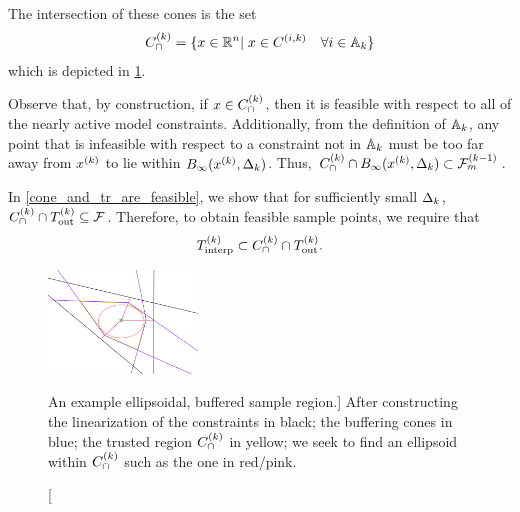 The intersection of these cones is the set
\begin{align}
{C^{(k)}_{\cap}} = \{x\in\mathbb R^n | \; x \in {C^{(i, k)}} \quad \forall i \in {\mathbb A_{k}} \} \label{define_capcones}
\end{align}
which is depicted in \cref{completed_2}.


Observe that, by construction,  if $x \in {C^{(k)}_{\cap}}$, then it is feasible with respect to all of the nearly active model constraints.  Additionally,  from the definition of ${\mathbb A_{k}}$, any point that is infeasible with respect to a constraint not in ${\mathbb A_{k}}$ must be too far away from $x^{(k)}$ to lie within  $B_\infty(x^{(k)},\Delta_k)$.  Thus, 
${C^{(k)}_{\cap}} \cap B_\infty(x^{(k)},\Delta_k) \subset {\mathcal F_m^{(k-1)}}$.  

In \cref{cone_and_tr_are_feasible}, we show that for sufficiently small $\Delta_k$, ${C^{(k)}_{\cap}} \cap {T_{\text{out}}^{(k)}} \subseteq {\mathcal F}$.
Therefore, to obtain feasible sample points, we require that 
\begin{align*}
{T_{\text{interp}}^{(k)}} \subset {C^{(k)}_{\cap}} \cap {T_{\text{out}}^{(k)}}.
\end{align*}



\begin{figure}[ht]
    \centering
    \includegraphics[width=150px]{images/completed_2.png}
    \caption
    	[An example ellipsoidal, buffered sample region.]{
    	After constructing 
    	the linearization of the constraints in black;
    	the buffering cones in blue;
    	the trusted region ${C^{(k)}_{\cap}}$ in yellow;
    	we seek to find an ellipsoid within ${C^{(k)}_{\cap}}$ such as the one in red/pink.
	}
    \label{completed_2}
\end{figure}














